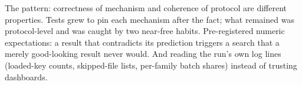 The pattern: correctness of mechanism and coherence of protocol are
different properties. Tests grew to pin each mechanism after the fact; what
remained was protocol-level and was caught by two near-free habits.
Pre-registered numeric expectations: a result that contradicts its
prediction triggers a search that a merely good-looking result never
would. And reading the run's own log lines (loaded-key counts,
skipped-file lists, per-family batch shares) instead of trusting
dashboards.
